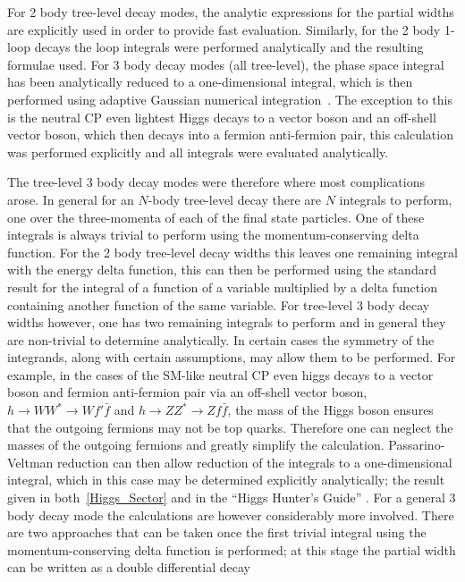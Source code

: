 \documentclass[final,3p,times,pdflatex]{elsarticle}
\begin{document}
For 2 body tree-level decay modes, the analytic expressions for the partial widths are explicitly used in order to
provide fast evaluation. Similarly, for the 2 body 1-loop decays the loop integrals were
performed analytically and the resulting formulae used.
For 3 body decay modes (all tree-level), the phase space integral
has been  analytically reduced to a one-dimensional integral, which is then
performed using adaptive Gaussian numerical integration~\cite{numRec}. The 
exception to this is the neutral CP even lightest Higgs decays to a vector
boson 
and an off-shell vector boson, which then decays into a fermion anti-fermion
pair, this calculation was performed explicitly and all integrals were
evaluated analytically. 

The tree-level 3 body decay modes were therefore where most complications arose. 
In general for an $N$-body tree-level decay there are $N$ integrals to perform,
one over the three-momenta of each of the final state particles. One of
these integrals is always trivial to perform using the momentum-conserving
delta function. For the 2 body tree-level decay widths this leaves one
remaining  integral with the energy delta function, this can then be performed
using 
the standard result for the integral of a function of a variable multiplied by
a delta function containing another function of the same variable. For
tree-level 3 body decay
widths however, one has two remaining integrals to perform and in general they are 
non-trivial to determine analytically. In certain cases the symmetry of
the integrands, along with certain assumptions, may allow them to be performed.
For example, in the cases of the SM-like neutral CP even higgs decays to a vector
boson and fermion anti-fermion pair via an off-shell vector boson,
$h \rightarrow WW^* \rightarrow W f' \bar{f}$ and 
$h \rightarrow ZZ^* \rightarrow Z f \bar{f}$, the
mass of the Higgs boson ensures that the outgoing fermions may not be top 
quarks. Therefore one can neglect the masses of the outgoing fermions and
greatly simplify the calculation. Passarino-Veltman reduction \cite{Passarino:1979} can then 
allow reduction of the integrals to a one-dimensional integral, which in 
this case may be determined explicitly analytically; the result given
in both~\ref{Higgs_Sector} and in the ``Higgs Hunter's Guide'' \cite{HHG}.
For a general 3 body decay mode the calculations are however considerably
more involved. There are two approaches that can be taken once the first
trivial integral using the momentum-conserving delta function is performed;
at this stage the partial width can be written as a double differential decay
\end{document}
